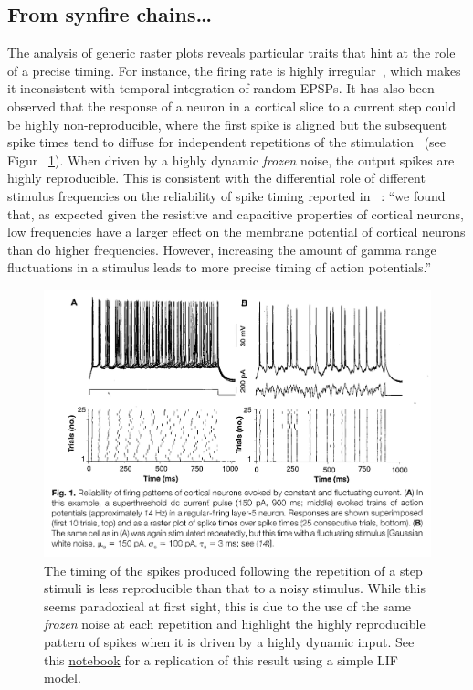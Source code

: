 \documentclass[brainsci, %
               review,submit,pdftex,moreauthors]{Definitions/mdpi}
\begin{document}
\subsection{From synfire chains\ldots{}}
The analysis of generic raster plots reveals particular traits that hint at the role of a precise timing. For instance, the firing rate is highly irregular~\citep{softky_highly_1993}, which makes it inconsistent with temporal integration of random EPSPs. It has also been observed that the response of a neuron in a cortical slice to a current step could be highly non-reproducible, where the first spike is aligned but the subsequent spike times tend to diffuse for independent repetitions of the stimulation~\citep{mainen_reliability_1995} (see Figur
~\ref{fig:mainen}). When driven by a highly dynamic \emph{frozen} noise, the output spikes are highly reproducible. This is consistent with the differential role of different stimulus frequencies on the reliability of spike timing reported in~\citep{nowak_influence_1997} : ``we found that, as expected given the resistive and capacitive properties of cortical neurons, low frequencies have a larger effect on the membrane potential of cortical neurons than do higher frequencies. However, increasing the amount of gamma range fluctuations in a stimulus leads to more precise timing of action potentials.''
\begin{figure}
\centering
\includegraphics[width=.7\textwidth]{figures/MainenSejnowski1995.png} %
\caption{The timing of the spikes produced following the repetition of a step stimuli is less reproducible than that to a noisy stimulus. While this seems paradoxical at first sight, this is due to the use of the same \emph{frozen} noise at each repetition and highlight the highly reproducible pattern of spikes when it is driven by a highly dynamic input. See this \href{https://github.com/laurentperrinet/2022_UE-neurosciences-computationnelles/blob/master/C_MainenSejnowski1995.ipynb}{notebook} for a replication of this result using a simple LIF model.}\label{fig:mainen}
\end{figure}
\end{document}
